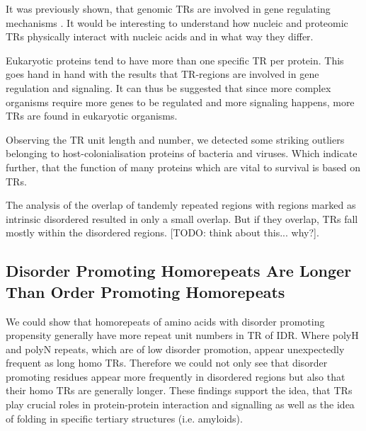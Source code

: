 \documentclass[a4,center,fleqn]{NAR}
\begin{document}
It was previously shown, that genomic TRs are involved in gene regulating mechanisms \cite{Bilgin2015, Theriot2013}. It would be interesting to understand how nucleic and proteomic TRs physically interact with nucleic acids and in what way they differ. 

Eukaryotic proteins tend to have more than one specific TR per protein. This goes hand in hand with the results that TR-regions are involved in gene regulation and signaling. It can thus be suggested that since more complex organisms require more genes to be regulated and more signaling happens, more TRs are found in eukaryotic organisms. 

Observing the TR unit length and number, we detected some striking outliers belonging to host-colonialisation proteins of bacteria and viruses. Which indicate further, that the function of many proteins which are vital to survival is based on TRs.

The analysis of the overlap of tandemly repeated regions with regions marked as intrinsic disordered resulted in only a small overlap. But if they overlap, TRs fall mostly within the disordered regions.  [TODO: think about this... why?].

\subsection{Disorder Promoting Homorepeats Are Longer Than Order Promoting Homorepeats}
We could show that homorepeats of amino acids with disorder promoting propensity generally have more repeat unit numbers in TR of IDR. Where polyH and polyN repeats, which are of low disorder promotion, appear unexpectedly frequent as long homo TRs.
Therefore we could not only see that disorder promoting residues appear more frequently in disordered regions but also that their homo TRs are generally longer. 
These findings support the idea, that TRs play crucial roles in protein-protein interaction and signalling as well as the idea of folding in specific tertiary structures (i.e. amyloids).
\end{document}
